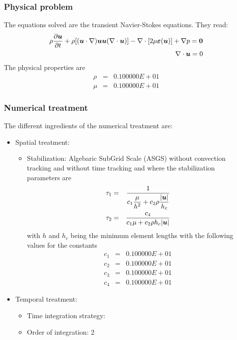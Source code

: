\documentclass[10pt]{article}
\begin{document}
\subsubsection{Physical problem}
The equations solved are the
transient Navier-Stokes equations.
They read:
\begin{eqnarray*}
\rho \frac{\partial \mbox{\boldmath $u$}}{\partial t}
+ \rho [(\mbox{\boldmath $u$} \cdot \nabla)\mbox{\boldmath $u$}\mbox{\boldmath $u$} (\nabla \cdot \mbox{\boldmath $u$})]
-\nabla \cdot [2\mu\mbox{\boldmath $\varepsilon$}(\mbox{\boldmath $u$)}] 
+ \nabla p 
=\mbox{\boldmath $0$}
\\ \qquad
\nabla \cdot \mbox{\boldmath $u$} = 0
\end{eqnarray*}
The physical properties are
\begin{eqnarray*}
    \rho &=& 0.100000E+01
 \\ \mu  &=& 0.100000E+01
\end{eqnarray*}
\subsubsection{Numerical treatment}
The different ingredients of the numerical treatment are:
\begin{itemize}
  \item Spatial treatment:
  \begin{itemize}
    \item Stabilization: Algebaric SubGrid Scale (ASGS)
 without convection tracking
 and without time tracking
 and where the stabilization parameters are
          \begin{eqnarray*}
\tau_1 &=& \frac{1}{{\displaystyle c_1 \frac{\mu}{h^2}}+ {\displaystyle c_2 \rho \frac{|\mbox{\boldmath $u$}|}{h_c}}} \\\tau_2 &=& \frac{c_4}{c_1 \mu +c_2 \rho h_c |\mbox{\boldmath $u$}|}
          \end{eqnarray*}
          with $h$ and $h_c$ being the minimum element lengths
          with the following values for the constants
          \begin{eqnarray*}
              c_1 &=& 0.100000E+01
           \\ c_2 &=& 0.100000E+01
           \\ c_3 &=& 0.100000E+01
           \\ c_4 &=& 0.100000E+01
          \end{eqnarray*}
  \end{itemize}
  \item Temporal treatment:
  \begin{itemize}
    \item Time integration strategy:     \item Order of integration: 2
\end{itemize}
\end{itemize}
\end{document}
